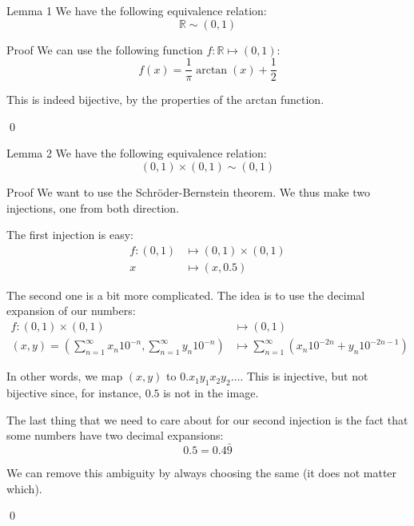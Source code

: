 \documentclass[a4paper]{article}
\begin{document}
\begin{parag}{Lemma 1}
    We have the following equivalence relation: 
    \[\mathbb{R} \sim \left(0, 1\right)\]

    \begin{subparag}{Proof}
        We can use the following function $f: \mathbb{R} \mapsto \left(0,1\right)$: 
        \[f\left(x\right) = \frac{1}{\pi}\arctan\left(x\right) + \frac{1}{2}\]

        This is indeed bijective, by the properties of the arctan function.

        \qed
    \end{subparag}
\end{parag}

\begin{parag}{Lemma 2}
    We have the following equivalence relation: 
    \[\left(0, 1\right) \times \left(0, 1\right) \sim \left(0, 1\right)\]
    
    \begin{subparag}{Proof}
        We want to use the Schröder-Bernstein theorem. We thus make two injections, one from both direction.

        The first injection is easy: 
        \[\begin{split}
        f: \left(0, 1\right) &\longmapsto \left(0, 1\right) \times \left(0, 1\right) \\
        x &\longmapsto \left(x, 0.5\right)
        \end{split}\]
        
        The second one is a bit more complicated. The idea is to use the decimal expansion of our numbers:
        \[\begin{split}
        f: \left(0, 1\right)\times\left(0,1\right) &\longmapsto \left(0, 1\right) \\
        \left(x, y\right) = \left(\sum_{n = 1}^{\infty} x_n 10^{-n}, \sum_{n=1}^{\infty} y_n 10^{-n}\right) &\longmapsto \sum_{n = 1}^{\infty} \left(x_n 10^{-2n} + y_n 10^{-2n - 1}\right)
        \end{split}\]

        In other words, we map $\left(x, y\right)$ to $0.x_1 y_1 x_2 y_2 \ldots$. This is injective, but not bijective since, for instance, $0.5$ is not in the image.
        
        The last thing that we need to care about for our second injection is the fact that some numbers have two decimal expansions: 
        \[0.5 = 0.4\bar{9}\]
        
        We can remove this ambiguity by always choosing the same (it does not matter which).

        \qed
    \end{subparag}
\end{parag}
\end{document}
